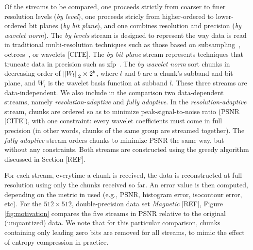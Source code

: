 Of the streams to be compared, one proceeds strictly from coarser to finer resolution levels
(\emph{by level}), one proceeds stricly from higher-ordered to lower-ordered bit planes (\emph{by
bit plane}), and one combines resolution and precision (\emph{by wavelet norm}). The \emph{by
levels} stream is designed to represent the way data is read in traditional multi-resolution
techniques such as those based on subsampling~\cite{idx2001}, octrees~\cite{multires_octree1999},
or wavelets [CITE]. The
\emph{by bit plane} stream represents techniques that truncate data in precision such as zfp~\cite{zfp2014}.
The \emph{by wavelet norm} sort chunks in decreasing order of $\left\lVert W_l\right\rVert_2 \times 2^b$, where $l$
and $b$ are a chunk's subband and bit plane, and $W_l$ is the wavelet basis function at subband $l$.
These three streams are data-independent. We also include in the comparison two data-dependent
streams, namely \emph{resolution-adaptive} and \emph{fully adaptive}. In the
\emph{resolution-adaptive} stream, chunks are ordered so as to minimize peak-signal-to-noise ratio
(PSNR [CITE]), with one constraint: every wavelet coefficients must come in full precision (in other
words, chunks of the same group are streamed together). The \emph{fully adaptive} stream orders
chunks to minimize PSNR the same way, but without any constraints. Both streams are constructed
using the greedy algorithm discussed in Section [REF].

For each stream, everytime a chunk is received, the data is reconstructed at full resolution using
only the chunks received so far. An error value is then computed, depending on the metric in used
(e.g., PSNR, histogram error, isocontour error, etc). For the $512 \times 512$, double-precision
data set \emph{Magnetic} [REF], Figure \ref{fig:motivation} compares the five streams in
PSNR relative to the original (unquantized) data. We note that for this particular comparison,
chunks containing only leading zero bits are removed for all streams, to mimic the effect of entropy
compression in practice.

